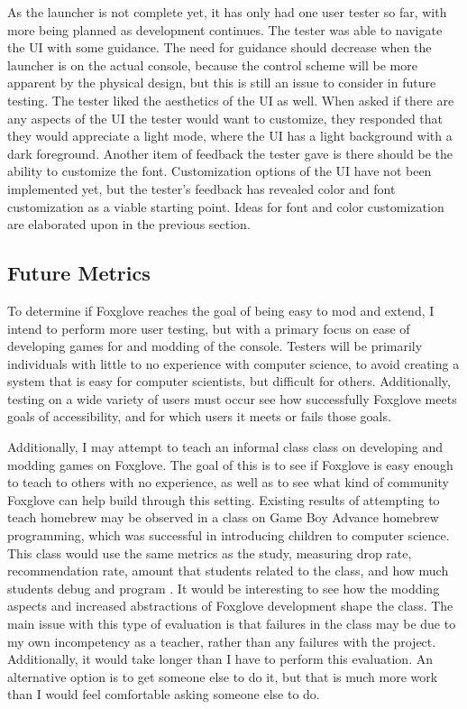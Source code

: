 \documentclass[10pt,twocolumn]{article}
\begin{document}
As the launcher is not complete yet, it has only had one user tester so far,
with more being planned as development continues. The tester was able to
navigate the UI with some guidance. The need for guidance should decrease when
the launcher is on the actual console, because the control scheme will be more
apparent by the physical design, but this is still an issue to consider in
future testing. The tester liked the aesthetics of the UI as well. When asked
if there are any aspects of the UI the tester would want to customize, they
responded that they would appreciate a light mode, where the UI has a light
background with a dark foreground. Another item of feedback the tester gave is
there should be the ability to customize the font. Customization options of the
UI have not been implemented yet, but the tester's feedback has revealed color
and font customization as a viable starting point. Ideas for font and color
customization are elaborated upon in the previous section.

\subsection{Future Metrics}

To determine if Foxglove reaches the goal of being easy to mod and
extend, I intend to perform more user testing, but with a primary focus on ease
of developing games for and modding of the console. Testers will be primarily
individuals with little to no experience with computer science, to avoid
creating a system that is easy for computer scientists,
but difficult for others. Additionally, testing on a wide variety of users must
occur see how successfully Foxglove meets goals of accessibility, and
for which users it meets or fails those goals.

Additionally, I may attempt to teach an informal class
class on developing and modding games on Foxglove. The goal of this is
to see if Foxglove is easy enough to teach to others with no
experience, as well as to see what kind of community Foxglove can help
build through this setting. Existing results of attempting to teach homebrew may
be observed in a class on Game Boy Advance homebrew programming, which was
successful in introducing children to computer science.
This class would use the same metrics
as the study, measuring drop rate, recommendation rate, amount that students
related to the class, and how much students debug and program
\cite{kacmarcik_introducing_2009}. It would be interesting to see how the
modding aspects and increased abstractions of Foxglove development shape the
class. The main issue with this type of evaluation is that
failures in the class may be due to my own incompetency as a teacher, rather
than any failures with the project. Additionally, it would take longer than I
have to perform this evaluation. An alternative option is to get someone else
to do it, but that is much more work than I would feel comfortable asking
someone else to do.
\end{document}
